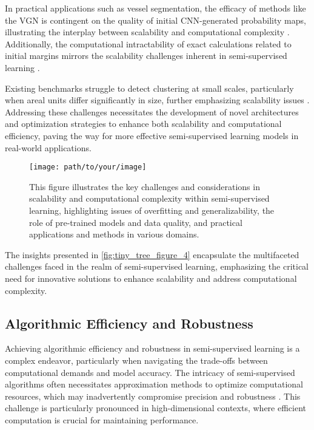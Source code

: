 In practical applications such as vessel segmentation, the efficacy of methods like the VGN is contingent on the quality of initial CNN-generated probability maps, illustrating the interplay between scalability and computational complexity \cite{shin2018deepvesselsegmentationlearning}. Additionally, the computational intractability of exact calculations related to initial margins mirrors the scalability challenges inherent in semi-supervised learning \cite{kun2022mathematicalfoundationsregressionmethods}.

Existing benchmarks struggle to detect clustering at small scales, particularly when areal units differ significantly in size, further emphasizing scalability issues \cite{vidanapathirana2022clusterdetectioncapabilitiesaverage}. Addressing these challenges necessitates the development of novel architectures and optimization strategies to enhance both scalability and computational efficiency, paving the way for more effective semi-supervised learning models in real-world applications. 

\begin{figure}[h]
    \centering
    \texttt{[image: path/to/your/image]}
    \caption{This figure illustrates the key challenges and considerations in scalability and computational complexity within semi-supervised learning, highlighting issues of overfitting and generalizability, the role of pre-trained models and data quality, and practical applications and methods in various domains.}
    \label{tiny_tree_figure_4}
\end{figure}

The insights presented in \autoref{fig:tiny_tree_figure_4} encapsulate the multifaceted challenges faced in the realm of semi-supervised learning, emphasizing the critical need for innovative solutions to enhance scalability and address computational complexity.


\subsection{Algorithmic Efficiency and Robustness} \label{subsec:Algorithmic Efficiency and Robustness}

Achieving algorithmic efficiency and robustness in semi-supervised learning is a complex endeavor, particularly when navigating the trade-offs between computational demands and model accuracy. The intricacy of semi-supervised algorithms often necessitates approximation methods to optimize computational resources, which may inadvertently compromise precision and robustness \cite{kun2022mathematicalfoundationsregressionmethods}. This challenge is particularly pronounced in high-dimensional contexts, where efficient computation is crucial for maintaining performance.


